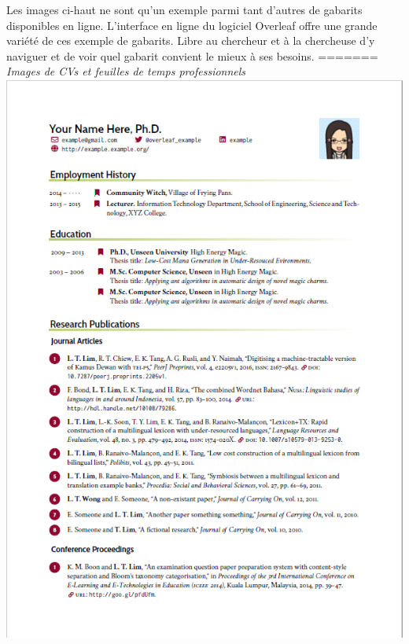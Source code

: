 \documentclass[
  letterpaper,
]{scrbook}
\begin{document}
Les images ci-haut ne sont qu'un exemple parmi tant d'autres de gabarits
disponibles en ligne. L'interface en ligne du logiciel Overleaf offre
une grande variété de ces exemple de gabarits. Libre au chercheur et à
la chercheuse d'y naviguer et de voir quel gabarit convient le mieux à
ses besoins. ======= \emph{Images de CVs et feuilles de temps
professionnels} \includegraphics{images/CVtemp.png}
\end{document}
